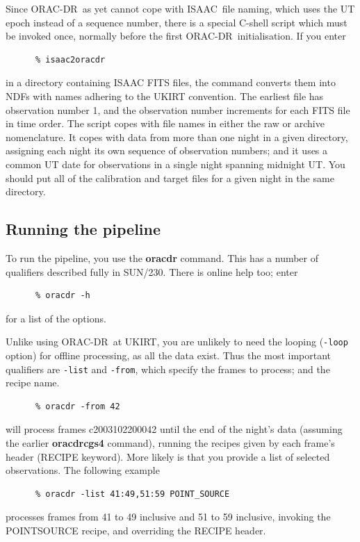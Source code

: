 \documentclass[twoside,11pt]{article}
\newcommand{\htmladdnormallink}[2]{#1}
\newcommand{\htmlref}[2]{#1}
\newcommand{\xref}[3]{#1}
\newcommand{\xlabel}[1]{}
\renewcommand{\_}{\texttt{\symbol{95}}}
\newcommand{\ORACDR}{{\footnotesize ORAC-DR}}
\newcommand{\UKIRT}{\htmladdnormallink{UKIRT}{http://www.jach.hawaii.edu/JACpublic/UKIRT/}}
\newcommand{\ISAAC}{\htmladdnormallink{ISAAC}{http://www.eso.org/instruments/isaac/}}
\begin{document}
Since \ORACDR\ as yet cannot cope with \ISAAC\ file naming, which
uses the UT epoch instead of a sequence number, there is a special
C-shell script which must be invoked once, normally before the first
\ORACDR\ initialisation. If you enter

\begin{verbatim}
      % isaac2oracdr
\end{verbatim}
in a directory containing ISAAC FITS files, the command converts them
into NDFs with names adhering to the UKIRT convention. The earliest
file has observation number 1, and the observation number increments
for each FITS file in time order. The script copes with file names in
either the raw or archive nomenclature. It copes with data from
more than one night in a given directory, assigning each night its
own sequence of observation numbers; and it uses a common UT date
for observations in a single night spanning midnight UT. You should
put all of the calibration and target files for a given night in
the same directory.

\subsection{\xlabel{running_the_pipeline}Running the
pipeline\label{running_the_pipeline}}

To run the pipeline, you use the {\bf oracdr} command. This has a
number of qualifiers described fully in \xref{SUN/230}{sun230}{oracdr}.
There is online help too; enter

\begin{verbatim}
      % oracdr -h
\end{verbatim}
for a list of the options.

Unlike using \ORACDR\ at \UKIRT, you are unlikely to need the looping
({\tt -loop} option) for offline processing, as all the data exist. Thus
the most important qualifiers are {\tt -list} and {\tt -from}, which
specify the frames to process; and the recipe name.

\begin{verbatim}
      % oracdr -from 42
\end{verbatim}
will process frames c20031022\_00042 until the end of the night's
data (assuming the earlier {\bf oracdr\_cgs4} command), running
the recipes given by each frame's header (RECIPE keyword). More likely
is that you provide a list of selected observations. The following
example

\begin{verbatim}
      % oracdr -list 41:49,51:59 POINT_SOURCE
\end{verbatim}
processes frames from 41 to 49 inclusive and 51 to 59 inclusive,
invoking the \htmlref{POINT\_SOURCE}{POINT\_SOURCE} recipe, and
overriding the RECIPE header.
\end{document}
